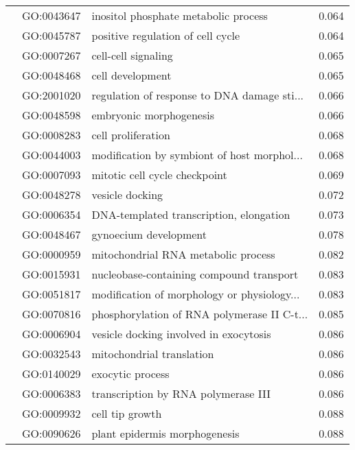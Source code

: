 \begin{longtable}{lllr}
   & GO:0043647 &         inositol phosphate metabolic process &         0.064 \\
   & GO:0045787 &            positive regulation of cell cycle &         0.064 \\
   & GO:0007267 &                          cell-cell signaling &         0.065 \\
   & GO:0048468 &                             cell development &         0.065 \\
   & GO:2001020 &  regulation of response to DNA damage sti... &         0.066 \\
   & GO:0048598 &                      embryonic morphogenesis &         0.066 \\
   & GO:0008283 &                           cell proliferation &         0.068 \\
   & GO:0044003 &  modification by symbiont of host morphol... &         0.068 \\
   & GO:0007093 &                mitotic cell cycle checkpoint &         0.069 \\
   & GO:0048278 &                              vesicle docking &         0.072 \\
   & GO:0006354 &      DNA-templated transcription, elongation &         0.073 \\
   & GO:0048467 &                        gynoecium development &         0.078 \\
   & GO:0000959 &          mitochondrial RNA metabolic process &         0.082 \\
   & GO:0015931 &     nucleobase-containing compound transport &         0.083 \\
   & GO:0051817 &  modification of morphology or physiology... &         0.083 \\
   & GO:0070816 &  phosphorylation of RNA polymerase II C-t... &         0.085 \\
   & GO:0006904 &       vesicle docking involved in exocytosis &         0.086 \\
   & GO:0032543 &                    mitochondrial translation &         0.086 \\
   & GO:0140029 &                             exocytic process &         0.086 \\
   & GO:0006383 &          transcription by RNA polymerase III &         0.086 \\
   & GO:0009932 &                              cell tip growth &         0.088 \\
   & GO:0090626 &                plant epidermis morphogenesis &         0.088 \\

\end{longtable}
